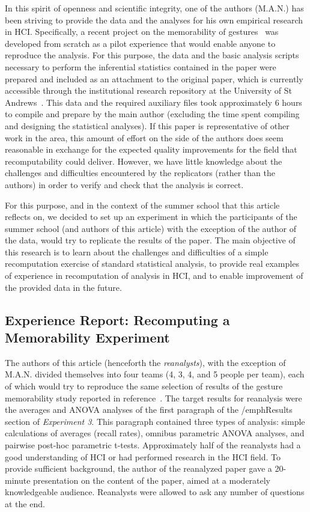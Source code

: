 In this spirit of openness and scientific integrity, one of the authors (M.A.N.) has been striving to provide the data and the analyses for his own empirical research in HCI. Specifically, a recent project on the memorability of gestures~\cite{Nacenta:memorability} was developed from scratch as a pilot experience that would enable anyone to reproduce the analysis. For this purpose, the data and the basic analysis scripts necessary to perform the inferential statistics contained in the paper were prepared and included as an attachment to the original paper, which is currently accessible through the institutional research repository at the University of St Andrews~\cite{Nacenta:memorability_data}. This data and the required auxiliary files took approximately 6 hours to compile and prepare by the main author (excluding the time spent compiling and designing the statistical analyses). If this paper is representative of other work in the area, this amount of effort on the side of the authors does seem reasonable in exchange for the expected quality improvements for the field that recomputability could deliver. However, we have little knowledge about the challenges and difficulties encountered by the replicators (rather than the authors) in order to verify and check that the analysis is correct.

For this purpose, and in the context of the summer school that this article reflects on, we decided to set up an experiment in which the participants of the summer school (and authors of this article) with the exception of the author of the data, would try to replicate the results of the paper. The main objective of this research is to learn about the challenges and difficulties of a simple recomputation exercise of standard statistical analysis, to provide real examples of experience in recomputation of analysis in HCI, and to enable improvement of the provided data in the future.

\subsection{Experience Report: Recomputing a Memorability Experiment}
The authors of this article (henceforth the \emph{reanalysts}), with the exception of
M.A.N. divided themselves into four teams (4, 3, 4, and 5 people per team), each of which would try to reproduce the same selection of results of the gesture memorability study reported in reference~\cite{Nacenta:memorability}. The target results for reanalysis were the averages and ANOVA analyses of the first paragraph of the /emph{Results} section of \emph{Experiment 3}. This paragraph contained three types of analysis: simple calculations of averages (recall rates), omnibus parametric ANOVA analyses, and pairwise post-hoc parametric t-tests. Approximately half of the reanalysts had a good understanding of HCI or had performed research in the HCI field. To provide sufficient background, the author of the reanalyzed paper gave a 20-minute presentation on the content of the paper, aimed at a moderately knowledgeable audience. Reanalysts were allowed to ask any number of questions at the end.

